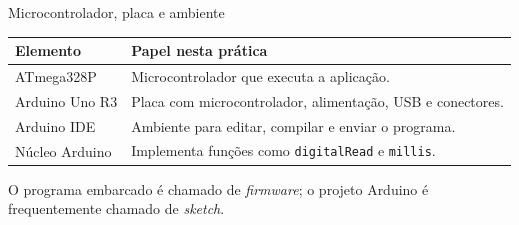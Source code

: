 \begin{frame}[t]{Microcontrolador, placa e ambiente}
\begin{center}\begin{tabularx}{\textwidth}{lX}\toprule
Elemento & Papel nesta prática\\\midrule
ATmega328P & Microcontrolador que executa a aplicação.\\[0.15cm]
Arduino Uno R3 & Placa com microcontrolador, alimentação, USB e conectores.\\[0.15cm]
Arduino IDE & Ambiente para editar, compilar e enviar o programa.\\[0.15cm]
Núcleo Arduino & Implementa funções como \texttt{digitalRead} e \texttt{millis}.\\\bottomrule
\end{tabularx}\end{center}
\small O programa embarcado é chamado de \textit{firmware}; o projeto Arduino é frequentemente chamado de \textit{sketch}.
\end{frame}
